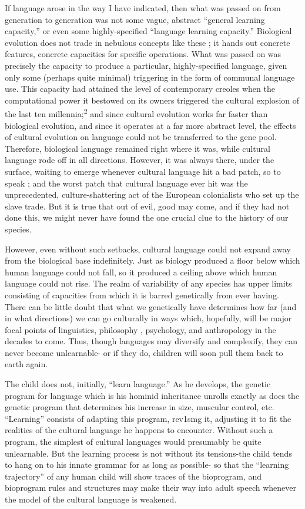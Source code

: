 If language arose in the way I have indicated, then what was passed on from generation to generation was not some vague, abstract ``general learning capacity,'' or even some highly-specified ``language
learning capacity.'' Biological evolution does not trade in nebulous concepts like these ; it hands out concrete features, concrete capacities for specific operations. What was passed on was precisely the capacity to produce a particular, highly-specified language, given only some (perhaps quite minimal) triggering in the form of communal language use. This capacity had attained the level of contemporary creoles when the computational power it bestowed on its owners triggered the cultural explosion of the last ten millennia;\textsuperscript{2} and since cultural evolu\-tion works far faster than biological evolution, and since it operates at a far more abstract level, the effects of cultural evolution on language could not be transferred to the gene pool. Therefore, biological lan\-guage remained right where it was, while cultural language rode off in all directions. However, it was always there, under the surface, waiting to emerge whenever cultural language hit a bad patch, so to speak ; and the worst patch that cultural language ever hit was the unprece\-dented, culture-shattering act of the European colonialists who set up the slave trade. But it is true that out of evil, good may come, and if they had not done this, we might never have found the one crucial clue to the history of our species.

However, even without such setbacks, cultural language could not expand away from the biological base indefinitely. Just as biology produced a floor below which human language could not fall, so it produced a ceiling above which human language could not rise. The realm of variability of any species has upper limits consisting of capa\-cities from which it is barred genetically from ever having. There can be little doubt that what we genetically have determines how far (and in what directions) we can go culturally in ways which, hopefully, will be major focal points of linguistics, philosophy , psychology, and anthropology in the decades to come. Thus, though languages may diversify and complexify, they can never become unlearnable- or if they do, children will soon pull them back to earth again.

The child does not, initially, ``learn language.'' As he develops,
the genetic program for language which is his hominid inheritance unrolls exactly as does the genetic program that determines his increase
in size, muscular control, etc. ``Learning'' consists of adapting this program, rev1smg it, adjusting it to fit the realities of the cultural language he happens to encounter. Without such a program, the sim\-plest of cultural languages would presumably be quite unlearnable. But the learning process is not without its tensions-the child tends to hang on to his innate grammar for as long as possible- so that the ``learning trajectory'' of any human child will show traces of the bioprogram, and bioprogram rules and structures may make their way into adult speech whenever the model of the cultural language is weakened.

